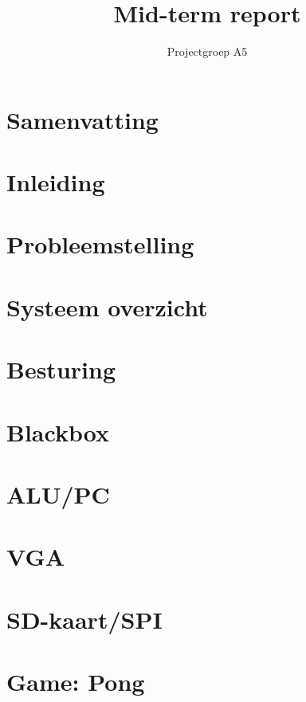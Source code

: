 \documentclass[oneside,dutch]{tudelft-report}
\begin{document}
\frontmatter

\title{Mid-term report}
\author{Projectgroep A5}
\maketitle
\chapter{Samenvatting}


\chapter{Inleiding}
\newpage

\chapter{Probleemstelling}
\newpage

\chapter{Systeem overzicht}
\newpage

\chapter{Besturing}

\newpage
\chapter{Blackbox}
\newpage

\chapter{ALU/PC}
\newpage

\chapter{VGA}
\newpage

\chapter{SD-kaart/SPI}
\newpage

\chapter{Game: Pong}
\end{document}
